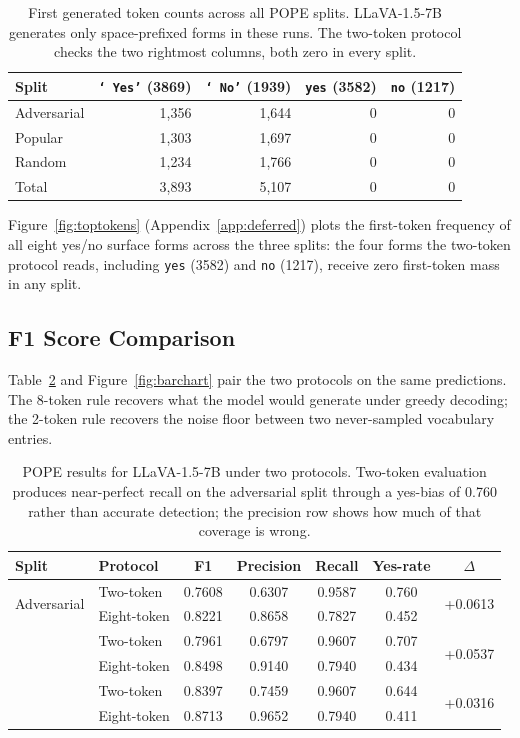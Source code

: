 \documentclass{article}
\begin{document}
\begin{table}[t]
\caption{First generated token counts across all POPE splits.
LLaVA-1.5-7B generates only space-prefixed forms in these runs.
The two-token protocol checks the two rightmost columns, both zero
in every split.}
\label{tab:tokens}
\centering
\begin{tabular}{lrrrr}
\toprule
Split & \texttt{`\,Yes'} (3869) & \texttt{`\,No'} (1939)
      & \texttt{yes} (3582) & \texttt{no} (1217) \\
\midrule
Adversarial & 1{,}356 & 1{,}644 & 0 & 0 \\
Popular     & 1{,}303 & 1{,}697 & 0 & 0 \\
Random      & 1{,}234 & 1{,}766 & 0 & 0 \\
\midrule
Total       & 3{,}893 & 5{,}107 & 0 & 0 \\
\bottomrule
\end{tabular}
\end{table}

Figure~\ref{fig:toptokens} (Appendix~\ref{app:deferred}) plots the
first-token frequency of all eight yes/no surface forms across the three
splits: the four forms the two-token protocol reads, including
\texttt{yes} (3582) and \texttt{no} (1217), receive zero first-token
mass in any split.

\subsection{F1 Score Comparison}

Table~\ref{tab:protocol} and Figure~\ref{fig:barchart} pair the two
protocols on the same predictions. The 8-token rule recovers what the
model would generate under greedy decoding; the 2-token rule recovers
the noise floor between two never-sampled vocabulary entries.

\begin{table}[t]
\caption{POPE results for LLaVA-1.5-7B under two protocols. Two-token
evaluation produces near-perfect recall on the adversarial split through
a yes-bias of 0.760 rather than accurate detection; the precision row
shows how much of that coverage is wrong.}
\label{tab:protocol}
\centering
\begin{tabular}{llccccc}
\toprule
Split & Protocol & F1 & Precision & Recall & Yes-rate & $\Delta$ \\
\midrule
\multirow{2}{*}{Adversarial}
 & Two-token   & 0.7608 & 0.6307 & 0.9587 & 0.760 &
   \multirow{2}{*}{+0.0613} \\
 & Eight-token & 0.8221 & 0.8658 & 0.7827 & 0.452 & \\
\addlinespace
\multirow{2}{*}{Popular}
 & Two-token   & 0.7961 & 0.6797 & 0.9607 & 0.707 &
   \multirow{2}{*}{+0.0537} \\
 & Eight-token & 0.8498 & 0.9140 & 0.7940 & 0.434 & \\
\addlinespace
\multirow{2}{*}{Random}
 & Two-token   & 0.8397 & 0.7459 & 0.9607 & 0.644 &
   \multirow{2}{*}{+0.0316} \\
 & Eight-token & 0.8713 & 0.9652 & 0.7940 & 0.411 & \\
\bottomrule
\end{tabular}
\end{table}
\end{document}
